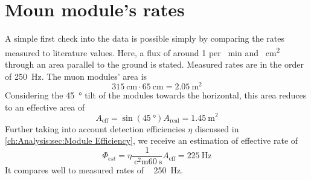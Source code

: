   \section{Moun module's rates}
  \label{ch:Analysis:sec:Muon module's rates}
  A simple first check into the data is possible simply by comparing the rates measured to literature values. Here, a flux of around 1 per \SI{}{\minute} and \SI{}{\square\centi\meter} through an area parallel to the ground is stated. Measured rates are in the order of \SI{250}{\hertz}. The muon modules' area is
  \begin{equation}
  	\SI{315}{\centi\meter} \cdot \SI{65}{\centi\meter} = \SI{2.05}{\square\meter}
  \end{equation}
  Considering the \SI{45}{\degree} tilt of the modules towards the horizontal, this area reduces to an effective area of 
  \begin{equation}
  	A_{\mathrm{eff}} = \sin{\left(\SI{45}{\degree}\right)} A_{\mathrm{real}} = \SI{1.45}{\square\meter}
  \end{equation}
  Further taking into account detection efficiencies $\eta$ discussed in \ref{ch:Analysis:sec:Module Efficiency}, we receive an estimation of effective rate of
  \begin{equation}
  	\Phi_{est} = \eta \frac{1}{\SI{}{\square\centi\meter}\SI{60}{\second}}A_{\mathrm{eff}} = \SI{225}{\hertz}
  \end{equation}
  It compares well to measured rates of  ~ \SI{250}{\hertz}.
  
